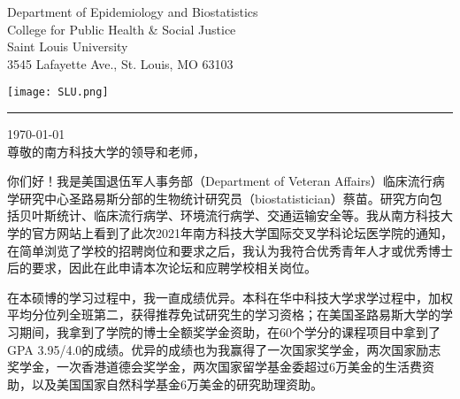 \documentclass[11pt, a4paper]{article}
\begin{document}
\begin{minipage}[c]{0.5\linewidth}
\textcolor{slublue}{Department of Epidemiology and Biostatistics}\\
\textcolor{slublue}{College for Public Health \& Social Justice}\\
\textcolor{slublue}{Saint Louis University}\\
\textcolor{slublue}{3545 Lafayette Ave., St. Louis, MO 63103}
\end{minipage}
\hfill
\begin{minipage}[c]{0.25\linewidth}
\texttt{[image: SLU.png]}%
\end{minipage}

\vspace{-5pt}
\par\noindent\rule{\textwidth}{0.4pt}
\vspace{-28pt}

\today\\
尊敬的南方科技大学的领导和老师，

\vspace*{\fill}

\setlength{\parindent}{24pt}%
你们好！我是美国退伍军人事务部（Department of Veteran Affairs）临床流行病学研究中心圣路易斯分部的生物统计研究员（biostatistician）蔡苗。研究方向包括贝叶斯统计、临床流行病学、环境流行病学、交通运输安全等。我从南方科技大学的官方网站上看到了此次2021年南方科技大学国际交叉学科论坛医学院的通知，在简单浏览了学校的招聘岗位和要求之后，我认为我符合优秀青年人才或优秀博士后的要求，因此在此申请本次论坛和应聘学校相关岗位。

在本硕博的学习过程中，我一直成绩优异。本科在华中科技大学求学过程中，加权平均分位列全班第二，获得推荐免试研究生的学习资格；在美国圣路易斯大学的学习期间，我拿到了学院的博士全额奖学金资助，在60个学分的课程项目中拿到了GPA 3.95/4.0的成绩。优异的成绩也为我赢得了一次国家奖学金，两次国家励志奖学金，一次香港道德会奖学金，两次国家留学基金委超过6万美金的生活费资助，以及美国国家自然科学基金6万美金的研究助理资助。
\end{document}
